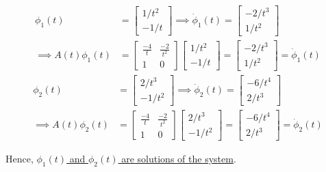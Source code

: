 \begin{align*}
    \phi_1(t)
     & =
    \begin{bmatrix}
        1/t^2 \\
        -1/t
    \end{bmatrix}
    \implies
    \dot \phi_1(t)
    =
    \begin{bmatrix}
        -2/t^3 \\
        1/t^2
    \end{bmatrix}
    \\
    \implies
    A(t)\phi_1(t)
     & =
    \begin{bmatrix}
        \frac{-4}{t} & \frac{-2}{t^2} \\
        1            & 0
    \end{bmatrix}
    \begin{bmatrix}
        1/t^2 \\
        -1/t
    \end{bmatrix}
    =
    \begin{bmatrix}
        -2/t^3 \\
        1/t^2
    \end{bmatrix}
    =
    \dot \phi_1(t)
\end{align*}
\begin{align*}
    \phi_2(t)
     & =
    \begin{bmatrix}
        2/t^3 \\
        -1/t^2
    \end{bmatrix}
    \implies
    \dot \phi_2(t)
    =
    \begin{bmatrix}
        -6/t^4 \\
        2/t^3
    \end{bmatrix}
    \\
    \implies
    A(t)\phi_2(t)
     & =
    \begin{bmatrix}
        \frac{-4}{t} & \frac{-2}{t^2} \\
        1            & 0
    \end{bmatrix}
    \begin{bmatrix}
        2/t^3 \\
        -1/t^2
    \end{bmatrix}
    =
    \begin{bmatrix}
        -6/t^4 \\
        2/t^3
    \end{bmatrix}
    =
    \dot \phi_2(t)
\end{align*}

Hence, \underline{\( \phi_1(t) \) and \( \phi_2(t) \) are solutions of the system}.

